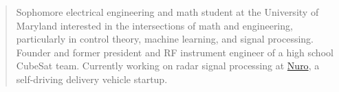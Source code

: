 \documentclass[10pt,a4paper,ragged2e,withhyper]{altacv}
\begin{document}


\makecvheader


\begin{quote}
Sophomore electrical engineering and math student at the University of Maryland interested in the intersections of math and engineering, particularly in control theory, machine learning, and signal processing. Founder and former president and RF instrument engineer of a high school CubeSat team. Currently working on radar signal processing at \href{https://nuro.ai/}{Nuro}, a self-driving delivery vehicle startup.
\end{quote}

\vspace{0.25cm}
\end{document}
